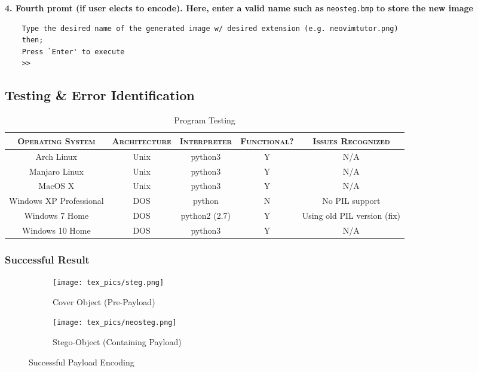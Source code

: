 \documentclass[11pt, english]{article}
\begin{document}
	\textbf{4. Fourth promt (if user elects to encode). Here, enter a valid name such as} \verb|neosteg.bmp| \textbf{to store the new image}

	{\scriptsize\begin{verbatim}
	Type the desired name of the generated image w/ desired extension (e.g. neovimtutor.png)
	then;
	Press `Enter' to execute
	>>
	\end{verbatim}}

\newpage

	\subsection{Testing \& Error Identification}

	\begin{table}[h]
		\scriptsize
		\renewcommand{\arraystretch}{1.25}
	\begin{center}
	\begin{tabular}{c|c|c|c|c}
		\hline
		\textsc{Operating System} & \textsc{Architecture} & \textsc{Interpreter} & \textsc{Functional?} & \textsc{Issues Recognized}\\
		\hline
		Arch Linux & Unix & python3 & Y & N/A\\
		Manjaro Linux & Unix & python3 & Y & N/A\\
		MacOS X & Unix & python3 & Y & N/A\\
		Windows XP Professional & DOS & python & N & No PIL support\\ 
		Windows 7 Home & DOS & python2 (2.7) & Y & Using old PIL version (fix)\\
		Windows 10 Home & DOS & python3 & Y & N/A\\
		\hline
	\end{tabular}
		\caption{Program Testing}
	\end{center}
	\end{table}
	
		\subsubsection{Successful Result}

	\begin{figure}[H]
	\begin{center}
		\begin{subfigure}[t]{6cm}
		\begin{center}
			\texttt{[image: tex\_pics/steg.png]}
		\end{center}
			\caption{Cover Object (Pre-Payload)}
		\end{subfigure}
		\begin{subfigure}[t]{6cm}
		\begin{center}
			\texttt{[image: tex\_pics/neosteg.png]}
		\end{center}
			\caption{Stego-Object (Containing Payload)}
		\end{subfigure}
	\end{center}
		\caption{Successful Payload Encoding}
	\end{figure}
\end{document}
